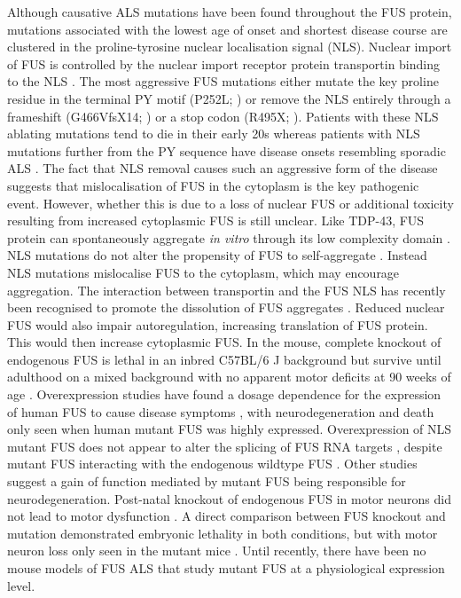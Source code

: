 Although causative ALS mutations have been found throughout the FUS protein, mutations associated with the lowest age of onset and shortest disease course are clustered in the proline-tyrosine nuclear localisation signal (NLS). 
Nuclear import of FUS is controlled by the nuclear import receptor protein transportin binding to the NLS \citep{Dormann2010}.
The most aggressive FUS mutations either mutate the key proline residue in the terminal PY motif (P252L; \citealt{Chio2009}) or remove the NLS entirely through a frameshift (G466VfsX14; \citealt{DeJesus-Hernandez2010}) or a stop codon (R495X; \citealt{Bosco2010}). 
Patients with these NLS ablating mutations tend to die in their early 20s whereas patients with NLS mutations further from the PY sequence have disease onsets resembling sporadic ALS \citep{Shang2016}.
The fact that NLS removal causes such an aggressive form of the disease suggests that mislocalisation of FUS in the cytoplasm is the key pathogenic event. 
However, whether this is due to a loss of nuclear FUS or additional toxicity resulting from increased cytoplasmic FUS is still unclear.
Like TDP-43, FUS protein can spontaneously aggregate \textit{in vitro} through its low complexity domain \citep{Murray2017}. 
NLS mutations do not alter the propensity of FUS to self-aggregate \citep{Sun2011}.
Instead NLS mutations mislocalise FUS to the cytoplasm, which may encourage aggregation. The interaction between transportin and the FUS NLS has recently been recognised to promote the dissolution of FUS aggregates \citep{Guo2018, Yoshizawa2018}. 
Reduced nuclear FUS would also impair autoregulation, increasing translation of FUS protein. This would then increase cytoplasmic FUS.
In the mouse, complete knockout of endogenous FUS is lethal in an inbred C57BL/6 J background  \citep{Hicks2000, Kuroda2000} but survive until adulthood on a mixed background with no apparent motor deficits at 90 weeks of age \citep{Kino2015}.
Overexpression studies have found a dosage dependence for the expression of human FUS to cause disease symptoms \citep{Verbeeck2012,Mitchell2013, Shiihashi2016}, with neurodegeneration and death only seen when human mutant FUS was highly expressed.
Overexpression of NLS mutant FUS does not appear to alter the splicing of FUS RNA targets \citep{Shiihashi2016}, despite mutant FUS interacting with the endogenous wildtype FUS \citep{Qiu2014}.
Other studies suggest a gain of function mediated by mutant FUS being responsible for neurodegeneration. 
Post-natal knockout of endogenous FUS  in motor neurons did not lead to motor dysfunction \citep{Sharma2016}.
A direct comparison between FUS knockout and mutation demonstrated embryonic lethality in both conditions, but with motor neuron loss only seen in the mutant mice \citep{Scekic-zahirovic2016}.  
Until recently, there have been no mouse models of FUS ALS that study mutant FUS at a physiological expression level.



